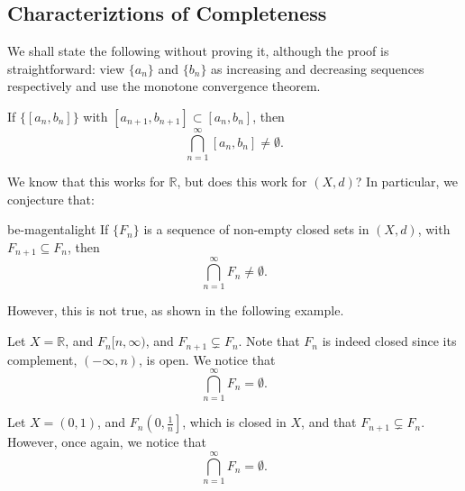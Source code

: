 \documentclass[notoc,notitlepage]{tufte-book}
\begin{document}
\subsection{Characteriztions of Completeness}%
\label{sub:characteriztions_of_completeness}

We shall state the following without proving it, although the proof is straightforward: view $\{ a_n \}$ and $\{ b_n \}$ as increasing and decreasing sequences respectively and use the monotone convergence theorem.

\begin{thm}\label{thm:nested_interval_theorem}
  If $\{ [ a_n, b_n ] \}$ with $[ a_{n + 1}, b_{n + 1} ] \subset [ a_n, b_n ]$, then
  \begin{equation*}
    \bigcap_{n = 1}^{\infty} [ a_n, b_n ] \neq \emptyset.
  \end{equation*}
\end{thm}

We know that this works for $\mathbb{R}$, but does this work for $(X, d)$? In particular, we conjecture that:

\begin{quotebox}{be-magenta}{light}
  If $\{ F_n \}$ is a sequence of non-empty closed sets in $(X, d)$, with $F_{n + 1} \subseteq F_n$, then
  \begin{equation*}
    \bigcap_{n = 1}^{\infty} F_n \neq \emptyset.
  \end{equation*}
\end{quotebox}

However, this is not true, as shown in the following example.

\begin{eg}
  Let $X = \mathbb{R}$, and $F_n [ n, \infty )$, and $F_{n + 1} \subsetneq F_n$. Note that $F_n$ is indeed closed since its complement, $(-\infty, n)$, is open. We notice that
  \begin{equation*}
    \bigcap_{n = 1}^{\infty} F_n = \emptyset.
  \end{equation*}
\end{eg}

\begin{eg}
  Let $X = (0, 1)$, and $F_n \left(0, \frac{1}{n}\right]$, which is closed in $X$, and that $F_{n + 1} \subsetneq F_n$. However, once again, we notice that
  \begin{equation*}
    \bigcap_{n = 1}^{\infty} F_n = \emptyset.
  \end{equation*}
\end{eg}
\end{document}
